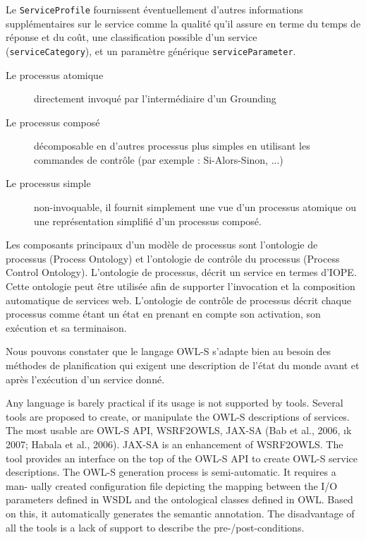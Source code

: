     Le \verb|ServiceProfile| fournissent éventuellement d'autres
    informations supplémentaires sur le service comme la qualité
    qu'il assure en terme du temps de réponse et du coût, une
    classification possible d'un service \\(\verb|serviceCategory|),
    et un paramètre générique \verb|serviceParameter|.
    \\
    {\color{red}

      \begin{description}
      \item[Le processus atomique] directement invoqué par
        l’intermédiaire d’un Grounding
      \item[Le processus composé] décomposable en d’autres processus
        plus simples en utilisant les commandes de contrôle (par
        exemple : Si-Alors-Sinon, ...)

      \item[Le processus simple] non-invoquable, il fournit simplement
        une vue d’un processus atomique ou une représentation
        simplifié d’un processus composé.
      \end{description}

      Les composants principaux d’un modèle de processus sont
      l’ontologie de processus (Process Ontology) et l’ontologie de
      contrôle du processus (Process Control Ontology).  L’ontologie
      de processus, décrit un service en termes d’IOPE. Cette
      ontologie peut être utilisée afin de supporter l’invocation et
      la composition automatique de services web.  L’ontologie de
      contrôle de processus décrit chaque processus comme étant un
      état en prenant en compte son activation, son exécution et sa
      terminaison.

      Nous pouvons constater que le langage OWL-S s'adapte bien au
      besoin des méthodes de planification qui exigent une description
      de l’état du monde avant et après l’exécution d’un service donné.

      Any language is barely practical if its usage is not supported
      by tools. Several tools are proposed to create, or manipulate
      the OWL-S descriptions of services.  The most usable are OWL-S
      API, WSRF2OWLS, JAX-SA (Bab  et al., 2006, ık 2007; Habala et
      al., 2006). JAX-SA is an enhancement of WSRF2OWLS. The tool
      provides an interface on the top of the OWL-S API to create
      OWL-S service descriptions. The OWL-S generation process is
      semi-automatic. It requires a man- ually created configuration
      file depicting the mapping between the I/O parameters defined in
      WSDL and the ontological classes defined in OWL. Based on this,
      it automatically generates the semantic annotation. The
      disadvantage of all the tools is a lack of support to describe
      the pre-/post-conditions.\cite{bartalos2011effective}

}
